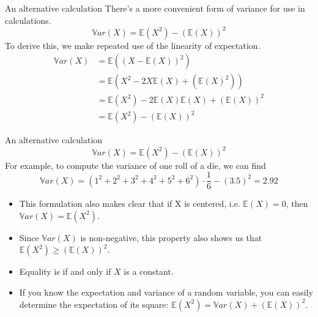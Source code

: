 \documentclass[aspectratio=169]{../latex_main/tntbeamer}  %
\begin{document}
	
	\begin{frame}[c]{An alternative calculation}
	    There’s a more convenient form of variance for use in calculations.
	    \begin{equation*}
	        \mathbb{V}ar(X) = \mathbb{E}(X^2) - (\mathbb{E}(X))^2
	    \end{equation*}
	    To derive this, we make repeated use of the linearity of expectation.
	    \begin{align*}
	        \mathbb{V}ar(X) &= \mathbb{E}((X-\mathbb{E}(X))^2)\\
	        &=  \mathbb{E}(X^2-2X\mathbb{E}(X) + (\mathbb{E}(X)^2))\\
	        &= \mathbb{E}(X^2) - 2\mathbb{E}(X)\mathbb{E}(X) + (\mathbb{E}(X))^2\\
	        &= \mathbb{E}(X^2) - (\mathbb{E}(X))^2
	    \end{align*}
	\end{frame}
	
	
	
	\begin{frame}[c]{An alternative calculation}
	    \begin{equation*}
	        \mathbb{V}ar(X) = \mathbb{E}(X^2) - (\mathbb{E}(X))^2
	    \end{equation*}
	    For example, to compute the variance of one roll of a die, we can find
	    \begin{equation*}
	        \mathbb{V}ar(X)= (1^2+2^2+3^2+4^2+5^2+6^2)\cdot \frac{1}{6}-(3.5)^2 = 2.92
	    \end{equation*}
	    
	    \begin{itemize}
	        \item This formulation also makes clear that if X is centered, i.e. $\mathbb{E}(X) = 0$, then $\mathbb{V}ar(X) = \mathbb{E}(X^2)$.
	        \item Since $\mathbb{V}ar(X)$ is non-negative, this property also shows us that $\mathbb{E}(X^2) \geq (\mathbb{E}(X))^2$.
	        \item Equality is if and only if $X$ is a constant.
	        \item If you know the expectation and variance of a random variable, you can easily determine the expectation of its square:   $\mathbb{E}(X^2) = \mathbb{V}ar(X) + (\mathbb{E}(X))^2$. 
	    \end{itemize}
	\end{frame}
	
\end{document}
